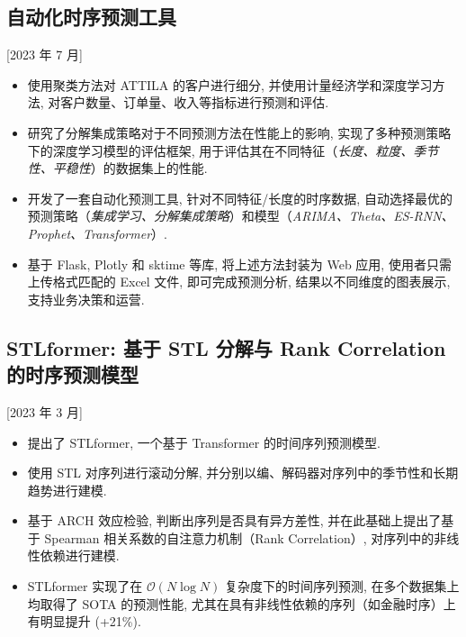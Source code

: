 \documentclass{mycv}
\begin{document}



\vspace{-\parskip}

\subsection{自动化时序预测工具}[2023 年 7 月]

\begin{itemize}
  \itemsep 0.4em
  \item 使用聚类方法对 ATTILA 的客户进行细分, 并使用计量经济学和深度学习方法, 对客户数量、订单量、收入等指标进行预测和评估.
  \item 研究了分解集成策略对于不同预测方法在性能上的影响, 实现了多种预测策略下的深度学习模型的评估框架, 用于评估其在不同特征（\emph{长度、粒度、季节性、平稳性}）的数据集上的性能.
  \item 开发了一套自动化预测工具, 针对不同特征/长度的时序数据, 自动选择最优的预测策略（\emph{集成学习、分解集成策略}）和模型（\emph{ARIMA、Theta、ES-RNN、Prophet、Transformer}）.
  \item 基于 Flask, Plotly 和 sktime 等库, 将上述方法封装为 Web 应用, 使用者只需上传格式匹配的 Excel 文件, 即可完成预测分析, 结果以不同维度的图表展示, 支持业务决策和运营.
\end{itemize}

\vspace{-\parskip}

\subsection{STLformer: 基于 STL 分解与 Rank Correlation 的时序预测模型}[2023 年 3 月]

\begin{itemize}
  \itemsep 0.4em
  \item 提出了 STLformer, 一个基于 Transformer 的时间序列预测模型.
  \item 使用 STL 对序列进行滚动分解, 并分别以编、解码器对序列中的季节性和长期趋势进行建模.
  \item 基于 ARCH 效应检验, 判断出序列是否具有异方差性, 并在此基础上提出了基于 Spearman 相关系数的自注意力机制（Rank Correlation）, 对序列中的非线性依赖进行建模.
  \item STLformer 实现了在 $\mathcal{O}(N \log{N})$ 复杂度下的时间序列预测, 在多个数据集上均取得了 SOTA 的预测性能, 尤其在具有非线性依赖的序列（如金融时序）上有明显提升 (+21\%).
\end{itemize}
\end{document}
